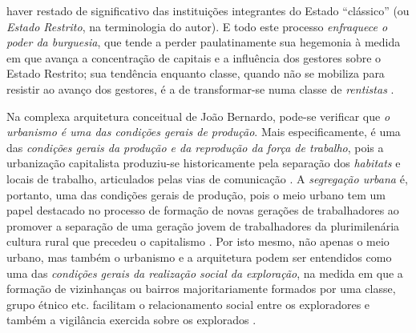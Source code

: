 haver restado de significativo das instituições integrantes do Estado ``clássico'' (ou \textit{Estado Restrito}, na terminologia do autor). E todo este processo \textit{enfraquece o poder da burguesia}, que tende a perder paulatinamente sua hegemonia à medida em que avança a concentração de capitais e a influência dos gestores sobre o Estado Restrito; sua tendência enquanto classe, quando não se mobiliza para resistir ao avanço dos gestores, é a de transformar-se numa classe de \textit{rentistas} \cite[p.~208-216]{BERNARDO1991}.

Na complexa arquitetura conceitual de João Bernardo, pode-se verificar que \textit{o urbanismo é uma das condições gerais de produção}. Mais especificamente, é uma das \textit{condições gerais da produção e da reprodução da força de trabalho}, pois a urbanização capitalista produziu-se historicamente pela separação dos \textit{habitats} e locais de trabalho, articulados pelas vias de comunicação \cite[p.~159]{BERNARDO1991}. A \textit{segregação urbana} é, portanto, uma das condições gerais de produção, pois o meio urbano tem um papel destacado no processo de formação de novas gerações de trabalhadores ao promover a separação de uma geração jovem de trabalhadores da plurimilenária cultura rural que precedeu o capitalismo \cite[p.~82-83]{BERNARDO1991}. Por isto mesmo, não apenas o meio urbano, mas também o urbanismo e a arquitetura podem ser entendidos como uma das \textit{condições gerais da realização social da exploração}, na medida em que a formação de vizinhanças ou bairros majoritariamente formados por uma classe, grupo étnico etc. facilitam o relacionamento social entre os exploradores e também a vigilância exercida sobre os explorados \cite[p.~160]{BERNARDO1991}. 

